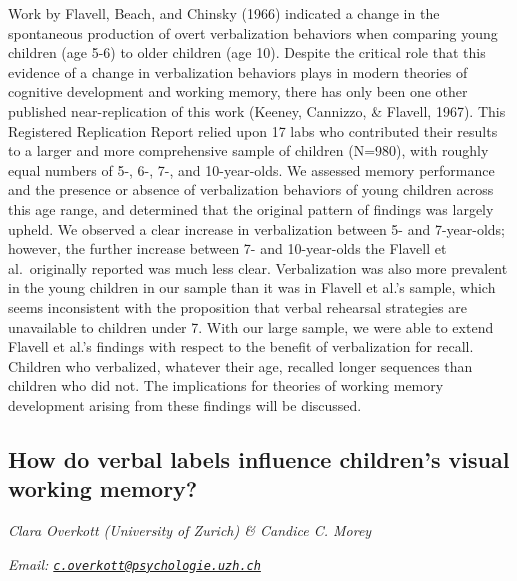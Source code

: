 \documentclass[
  12pt,
]{book}
\begin{document}
Work by Flavell, Beach, and Chinsky (1966) indicated a change in the spontaneous production of overt verbalization behaviors when comparing young children (age 5-6) to older children (age 10). Despite the critical role that this evidence of a change in verbalization behaviors plays in modern theories of cognitive development and working memory, there has only been one other published near-replication of this work (Keeney, Cannizzo, \& Flavell, 1967). This Registered Replication Report relied upon 17 labs who contributed their results to a larger and more comprehensive sample of children (N=980), with roughly equal numbers of 5-, 6-, 7-, and 10-year-olds. We assessed memory performance and the presence or absence of verbalization behaviors of young children across this age range, and determined that the original pattern of findings was largely upheld. We observed a clear increase in verbalization between 5- and 7-year-olds; however, the further increase between 7- and 10-year-olds the Flavell et al.~originally reported was much less clear. Verbalization was also more prevalent in the young children in our sample than it was in Flavell et al.'s sample, which seems inconsistent with the proposition that verbal rehearsal strategies are unavailable to children under 7. With our large sample, we were able to extend Flavell et al.'s findings with respect to the benefit of verbalization for recall. Children who verbalized, whatever their age, recalled longer sequences than children who did not. The implications for theories of working memory development arising from these findings will be discussed.

\hypertarget{how-do-verbal-labels-influence-childrens-visual-working-memory}{%
\subsection{How do verbal labels influence children's visual working memory?}\label{how-do-verbal-labels-influence-childrens-visual-working-memory}}

\emph{Clara Overkott (University of Zurich) \& Candice C. Morey}

\emph{Email: \href{mailto:c.overkott@psychologie.uzh.ch}{\nolinkurl{c.overkott@psychologie.uzh.ch}}}
\end{document}
